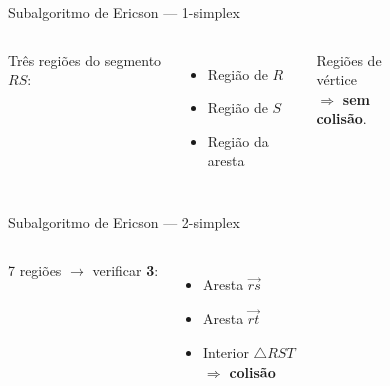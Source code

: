 \documentclass[12pt]{beamer}
\begin{document}
\begin{frame}{Subalgoritmo de Ericson — 1-simplex}
  \begin{columns}[c]
      Três regiões do segmento $RS$:
      \vspace{0.3cm}
      \begin{itemize}
        \item Região de $R$
        \item Região de $S$
        \item Região da aresta
      \end{itemize}
      \vspace{0.3cm}
      {\small Regiões de vértice\\$\Rightarrow$ \textbf{sem colisão}.}
      \begin{figure}
        \centering
        
      \end{figure}
  \end{columns}
\end{frame}

\begin{frame}{Subalgoritmo de Ericson — 2-simplex}
  \begin{columns}[c]
      7 regiões $\to$ verificar \textbf{3}:
      \vspace{0.3cm}
      \begin{itemize}
        \item Aresta $\vec{rs}$
        \item Aresta $\vec{rt}$
        \item Interior $\triangle RST$\\
              $\Rightarrow$ \textbf{colisão}
      \end{itemize}
      \begin{figure}
        \centering
        
      \end{figure}
  \end{columns}
\end{frame}
\end{document}
